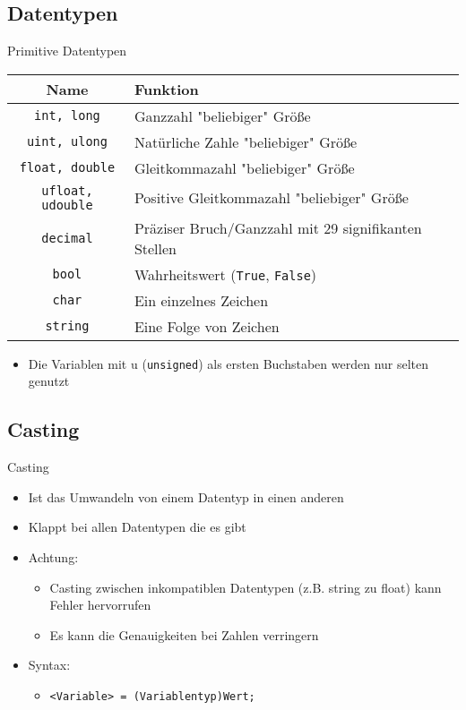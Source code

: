 \subsection{Datentypen}
\begin{frame}{Primitive Datentypen}
	\begin{tabular}{c|l}
		Name & Funktion \\ \hline
		\texttt{int, long} & Ganzzahl "beliebiger" Größe \\
		\texttt{uint, ulong} & Natürliche Zahle "beliebiger" Größe \\
		\texttt{float, double} & Gleitkommazahl "beliebiger" Größe \\
		\texttt{ufloat, udouble} & Positive Gleitkommazahl "beliebiger" Größe \\
        \texttt{decimal} & Präziser Bruch/Ganzzahl mit 29 signifikanten Stellen \\
		\texttt{bool} & Wahrheitswert (\texttt{True}, \texttt{False})\\
        \texttt{char} & Ein einzelnes Zeichen \\
		\texttt{string} & Eine Folge von Zeichen \\
	\end{tabular}
	\begin{itemize}
		 \item Die Variablen mit u (\texttt{unsigned}) als ersten Buchstaben werden nur selten genutzt
	\end{itemize}
\end{frame}

\subsection{Casting}
\begin{frame}{Casting}
	\begin{itemize}
		\item Ist das Umwandeln von einem Datentyp in einen anderen
		\item Klappt bei allen Datentypen die es gibt
		\item Achtung:
		\begin{itemize}
			\item Casting zwischen inkompatiblen Datentypen (z.B. string zu float) kann Fehler hervorrufen
			\item Es kann die Genauigkeiten bei Zahlen verringern
		\end{itemize}
		\item Syntax:
		\begin{itemize}
			\item \texttt{\alert{<Variable>} = (\alert{Variablentyp})\alert{Wert};}
		\end{itemize}
	\end{itemize}
		
\end{frame}

